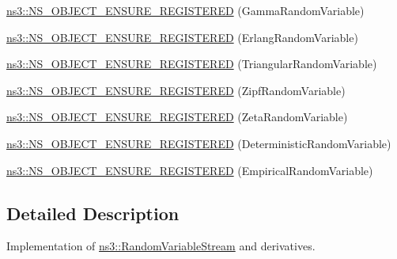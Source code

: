 \begin{DoxyCompactItemize}
\hyperlink{namespacens3_a06f3e6d6b5600b41d7c83ce02effc307}{ns3\+::\+N\+S\+\_\+\+O\+B\+J\+E\+C\+T\+\_\+\+E\+N\+S\+U\+R\+E\+\_\+\+R\+E\+G\+I\+S\+T\+E\+R\+ED} (Gamma\+Random\+Variable)
\item 
\hyperlink{namespacens3_ab3735d32238fcdc5d34e59d2aa516ca8}{ns3\+::\+N\+S\+\_\+\+O\+B\+J\+E\+C\+T\+\_\+\+E\+N\+S\+U\+R\+E\+\_\+\+R\+E\+G\+I\+S\+T\+E\+R\+ED} (Erlang\+Random\+Variable)
\item 
\hyperlink{namespacens3_a7f000b21d7735b22b29ad48e365dcdd4}{ns3\+::\+N\+S\+\_\+\+O\+B\+J\+E\+C\+T\+\_\+\+E\+N\+S\+U\+R\+E\+\_\+\+R\+E\+G\+I\+S\+T\+E\+R\+ED} (Triangular\+Random\+Variable)
\item 
\hyperlink{namespacens3_a42562f7a6be019aac073e1fa17ffdf92}{ns3\+::\+N\+S\+\_\+\+O\+B\+J\+E\+C\+T\+\_\+\+E\+N\+S\+U\+R\+E\+\_\+\+R\+E\+G\+I\+S\+T\+E\+R\+ED} (Zipf\+Random\+Variable)
\item 
\hyperlink{namespacens3_a04bfab15b8d578ec2da6d0ec0adb72bc}{ns3\+::\+N\+S\+\_\+\+O\+B\+J\+E\+C\+T\+\_\+\+E\+N\+S\+U\+R\+E\+\_\+\+R\+E\+G\+I\+S\+T\+E\+R\+ED} (Zeta\+Random\+Variable)
\item 
\hyperlink{namespacens3_a998c9a8f5d315ff8036d1df51dd09d0f}{ns3\+::\+N\+S\+\_\+\+O\+B\+J\+E\+C\+T\+\_\+\+E\+N\+S\+U\+R\+E\+\_\+\+R\+E\+G\+I\+S\+T\+E\+R\+ED} (Deterministic\+Random\+Variable)
\item 
\hyperlink{namespacens3_a58c5affc2bbcfd68eb8a0a698eebd513}{ns3\+::\+N\+S\+\_\+\+O\+B\+J\+E\+C\+T\+\_\+\+E\+N\+S\+U\+R\+E\+\_\+\+R\+E\+G\+I\+S\+T\+E\+R\+ED} (Empirical\+Random\+Variable)
\end{DoxyCompactItemize}


\subsection{Detailed Description}
Implementation of \hyperlink{classns3_1_1RandomVariableStream}{ns3\+::\+Random\+Variable\+Stream} and derivatives. 